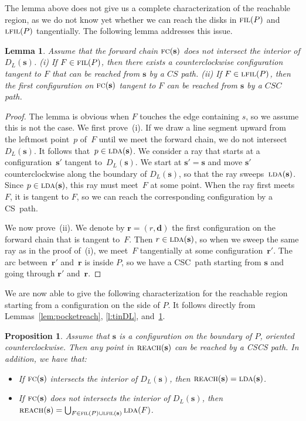 \documentclass[a4paper]{article}
\newcommand{\vecs}{{\mathbf{s}}}
\newcommand{\dir}{{\mathbf{d}}}
\newcommand{\vecr}{{\mathbf{r}}}
\newcommand{\ldisk}{{D_L}}
\DeclareMathOperator{\reach}{\textsc{reach}}
\DeclareMathOperator{\FIL}{\textsc{fil}}
\DeclareMathOperator{\LFIL}{\textsc{lfil}}
\DeclareMathOperator{\LDA}{\textsc{lda}}
\DeclareMathOperator{\FC}{\textsc{fc}}
\newtheorem{lemma}[theorem]{Lemma}
\newtheorem{prop}[theorem]{Proposition}
\begin{document}
The lemma above does not give us a complete characterization of the
reachable region, as we do not know yet whether we can reach the disks
in $\FIL(P)$ and $\LFIL(P)$ tangentially. The following lemma
addresses this issue.

\begin{lemma}\label{lem:reachfilling}
Assume that the forward chain $\FC(\vecs)$ does not intersect the interior of
$\ldisk(\vecs)$. (i) If $F \in \FIL(P)$, then there exists 
a counterclockwise configuration tangent to $F$ that can be reached 
from $\vecs$ by a $CS$ path. (ii) If $F \in \LFIL(P)$, then the first 
configuration on $\FC(\vecs)$ tangent to $F$ can be reached
from $\vecs$ by a $CSC$ path.
\end{lemma}
\begin{proof}
  The lemma is obvious when $F$ touches the edge containing $s$, so we
  assume this is not the case.  We first prove~(i). If we draw a line
  segment upward from the leftmost point~$p$ of~$F$ until we meet the
  forward chain, we do not intersect~$\ldisk(\vecs)$. It follows
  that~$p \in \LDA(\vecs)$.  We consider a ray that starts at a
  configuration~$\vecs'$ tangent to~$\ldisk(\vecs)$. We start at
  $\vecs'=\vecs$ and move $\vecs'$ counterclockwise along the boundary
  of $\ldisk(\vecs)$, so that the ray sweeps~$\LDA(\vecs)$. Since $p
  \in \LDA(\vecs)$, this ray must meet~$F$ at some point.  When the
  ray first meets~$F$, it is tangent to $F$, so we can reach the
  corresponding configuration by a CS~path.

  We now prove~(ii). We denote by $\vecr=(r,\dir)$ the first
  configuration on the forward chain that is tangent to~$F$. Then $r
  \in \LDA(\vecs)$, so when we sweep the same ray as in the proof
  of~(i), we meet~$F$ tangentially at some configuration~$\vecr'$. The
  arc between~$\vecr'$ and~$\vecr$ is inside $P$, so we have a
  CSC~path starting from $\vecs$ and going through $\vecr'$
  and~$\vecr$.
\end{proof}

We are now able to give the following characterization for
the reachable region starting from a configuration on the
side of $P$. It follows directly from Lemmas~\ref{lem:pocketreach},
\ref{l:tinDL}, and~\ref{lem:reachfilling}.
\begin{prop}\label{p:reachside} 
Assume that $\vecs$ is a configuration on the boundary of $P$,
oriented counterclockwise.
Then any point in $\reach(\vecs)$ can be reached by a CSCS path.
In addition, we have that:
\begin{itemize}
\item[(i)] If $\FC(\vecs)$ intersects the interior of $\ldisk(\vecs)$,
  then $\reach(\vecs) = \LDA(\vecs)$.
\item[(ii)] If $\FC(\vecs)$ does not intersects the interior of
  $\ldisk(\vecs)$,  then  $\reach(\vecs)=\bigcup_{F \in \FIL(P) \cup
  \LFIL(\vecs)} \LDA(F)$. 
\end{itemize}
\end{prop}
\end{document}

